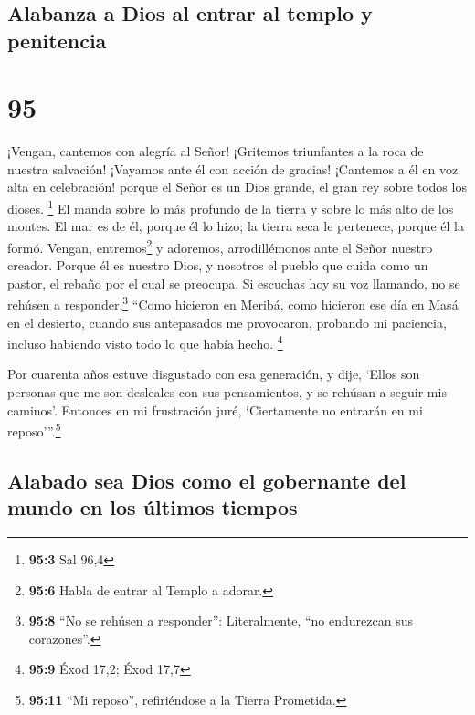 \hypertarget{alabanza-a-dios-al-entrar-al-templo-y-penitencia}{%
\subsection{Alabanza a Dios al entrar al templo y
penitencia}\label{alabanza-a-dios-al-entrar-al-templo-y-penitencia}}

\hypertarget{section-94}{%
\section{95}\label{section-94}}

 ¡Vengan, cantemos con alegría al Señor! ¡Gritemos
triunfantes a la roca de nuestra salvación!  ¡Vayamos ante
él con acción de gracias! ¡Cantemos a él en voz alta en celebración!
 porque el Señor es un Dios grande, el gran rey sobre
todos los dioses. \footnote{\textbf{95:3} Sal 96,4}  El
manda sobre lo más profundo de la tierra y sobre lo más alto de los
montes.  El mar es de él, porque él lo hizo; la tierra
seca le pertenece, porque él la formó.  Vengan,
entremos\footnote{\textbf{95:6} Habla de entrar al Templo a adorar.} y
adoremos, arrodillémonos ante el Señor nuestro creador. 
Porque él es nuestro Dios, y nosotros el pueblo que cuida como un
pastor, el rebaño por el cual se preocupa. Si escuchas hoy su voz
llamando,  no se rehúsen a responder,\footnote{\textbf{95:8}
  ``No se rehúsen a responder'': Literalmente, ``no endurezcan sus
  corazones''.} ``Como hicieron en Meribá, como hicieron ese día en Masá
en el desierto,  cuando sus antepasados me provocaron,
probando mi paciencia, incluso habiendo visto todo lo que había hecho.
\footnote{\textbf{95:9} Éxod 17,2; Éxod 17,7}

 Por cuarenta años estuve disgustado con esa generación,
y dije, `Ellos son personas que me son desleales con sus pensamientos, y
se rehúsan a seguir mis caminos'.  Entonces en mi
frustración juré, `Ciertamente no entrarán en mi reposo'''.\footnote{\textbf{95:11}
  ``Mi reposo'', refiriéndose a la Tierra Prometida.}

\hypertarget{alabado-sea-dios-como-el-gobernante-del-mundo-en-los-uxfaltimos-tiempos}{%
\subsection{Alabado sea Dios como el gobernante del mundo en los últimos
tiempos}\label{alabado-sea-dios-como-el-gobernante-del-mundo-en-los-uxfaltimos-tiempos}}

